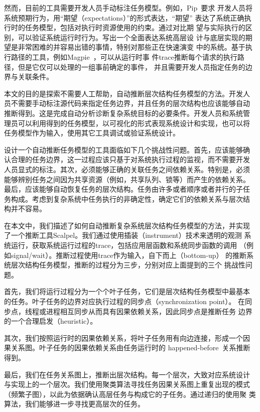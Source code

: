 然而，目前的工具需要开发人员手动标注任务模型。例如，Pip~\cite{pip}要求
开发人员将系统预期行为，用“期望（expectations）”的形式表达，“期望”
表达了系统正确执行时的任务模型，包括对执行时资源使用的约束。通过对比期
望与实际执行的区别，可以验证系统运行时行为。写出一个全面表达系统高层设
计与底层实现的期望是非常困难的并容易出错的事情，特别对那些正在快速演变
中的系统。基于执行路径的工具，例如Magpie~\cite{magpie}，可以从运行时事
件trace推断每个请求的执行路径，但是它仅可以处理的一组事前确定的事件，
并且需要开发人员指定任务的边界与关联条件。

本文的目的是探索不需要人工帮助，自动推断层次结构任务模型的方法。开发人
员不需要手动标注源代码来指定任务边界，并且任务的层次结构也应该能够自动
推断得到。这是完成自动分析诊断复杂系统目标的必要条件。开发人员和系统管
理员可以利用得到的任务模型，以可视化的形式表现系统设计和实现，也可以将
任务模型作为输入，使用其它工具调试或验证系统设计。

设计一个自动推断任务模型的工具面临如下几个挑战性问题。首先，应该能够确
认合理的任务边界，这一过程应该只基于对系统执行过程的监视，而不需要开发
人员显式的标注。其次，必须能够正确的关联任务之间依赖关系。特别是，必须
能够辨别任务之间因为共享资源（例如，共享队列、锁等）而产生的依赖关系。
最后，应该能够自动恢复任务的层次结构。任务由许多或者顺序或者并行的子任
务构成。考虑到复杂系统中任务执行的非确定性，确定它们的依赖关系与层次结
构并不容易。

在本文中，我们描述了如何自动推断复杂系统层次结构任务模型的方法，并实现
了一个推断工具Scalpel。我们通过使用插装（instrument）技术来透明的观测
系统运行，获取系统运行过程的trace，包括应用层函数和系统同步函数的调用
（例如signal/wait）。推断过程使用trace作为输入，自下而上（bottom-up）
的推断系统层次结构任务模型，推断的过程分为三步，分别对应上面提到的三个
挑战性问题。

首先，我们将运行过程分为一个个叶子任务，它们是层次结构任务模型中最基本
的任务。叶子任务的边界对应执行过程的同步点（synchronization point）。
在同步点，线程或进程相互同步从而具有因果依赖关系，因此同步点是推断任务
边界的一个合理启发（heuristic）。

其次，我们按照运行时的因果依赖关系，将叶子任务用有向边连接，形成一个因
果关系图。叶子任务的因果依赖关系由任务运行时的
happened-before~\cite{lamport_clock}关系推断得到。

最后，我们在任务关系图上，推断出层次结构。每一个层次，大致对应系统设计
与实现上的一个层次。我们使用聚类算法寻找任务因果关系图上重复出现的模式
（频繁子图），以此为依据确认高层任务与构成它的子任务。通过递归的使用聚
类算法，我们能够进一步寻找更高层次的任务。

